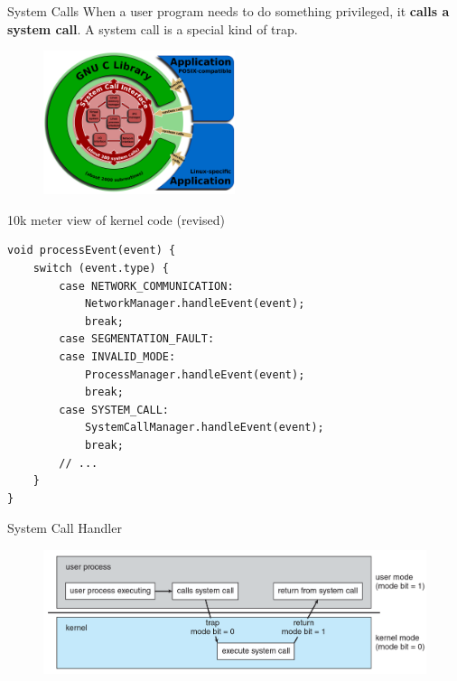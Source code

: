 
\begin{frame}[fragile]{System Calls}
	When a user program needs to do something privileged, it \textbf{calls a system call}. A system call is a special kind of trap.
	\begin{figure}[H]
		\centering
		\includegraphics[width=0.5\textwidth]{day3/img/syscall.png}
	\end{figure}

\end{frame}

\begin{frame}[fragile]{10k meter view of kernel code (revised)}
	\begin{verbatim}
void processEvent(event) {
    switch (event.type) {
        case NETWORK_COMMUNICATION:
            NetworkManager.handleEvent(event);
            break;
        case SEGMENTATION_FAULT:
        case INVALID_MODE:
            ProcessManager.handleEvent(event);
            break;
        case SYSTEM_CALL:
            SystemCallManager.handleEvent(event);
            break;
        // ...
    }
}
    \end{verbatim}
\end{frame}

\begin{frame}[fragile]{System Call Handler}
	\begin{figure}[H]
		\centering
		\includegraphics[width=\textwidth]{day3/img/interrupt.png}
	\end{figure}
\end{frame}

